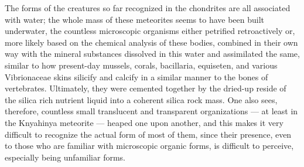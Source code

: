 \documentclass[a4paper, 12pt, oneside]{article}
\begin{document}
The forms of the creatures so far recognized in the chondrites are all associated with water; the whole mass of these meteorites seems to have been built underwater, the countless microscopic organisms either petrified retroactively or, more likely based on the chemical analysis of these bodies, combined in their own way with the mineral substances dissolved in this water and assimilated the same, similar to how present-day mussels, corals, bacillaria, equiseten, and various Vibrionaceae skins silicify and calcify in a similar manner to the bones of vertebrates. Ultimately, they were cemented together by the dried-up reside of the silica rich nutrient liquid into a coherent silica rock mass. One also sees, therefore, countless small translucent and transparent organizations --- at least in the Knyahinya meteorite --- heaped one upon another, and this makes it very difficult to recognize the actual form of most of them, since their presence, even to those who are familiar with microscopic organic forms, is difficult to perceive, especially being unfamiliar forms.
\end{document}
